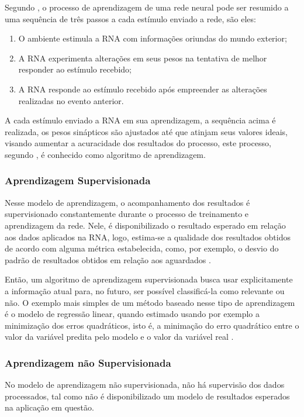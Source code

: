 Segundo , o processo de aprendizagem de uma rede neural pode ser resumido a uma sequência de três passos a cada estímulo enviado a rede, são eles:

\begin{enumerate}
	\item O ambiente estimula a RNA com informações oriundas do mundo exterior;
	\item A RNA experimenta alterações em seus pesos na tentativa de melhor responder ao estímulo recebido;
	\item A RNA responde ao estímulo recebido após empreender as alterações realizadas no evento anterior.
\end{enumerate}

A cada estímulo enviado a RNA em sua aprendizagem, a sequência acima é realizada, os pesos sinápticos são ajustados até que atinjam seus valores ideais, visando aumentar a acuracidade dos resultados do processo, este processo, segundo , é conhecido como algoritmo de aprendizagem.

\subsubsection{Aprendizagem Supervisionada}
Nesse modelo de aprendizagem, o acompanhamento dos resultados é supervisionado constantemente durante o processo de treinamento e aprendizagem da rede. Nele, é disponibilizado o resultado esperado em relação aos dados aplicados na RNA, logo, estima-se a qualidade dos resultados obtidos de acordo com alguma métrica estabelecida, como, por exemplo, o desvio do padrão de resultados obtidos em relação aos aguardados \cite{haykin2009}.

Então, um algoritmo de aprendizagem supervisionada busca usar explicitamente a informação atual para, no futuro,  ser possível classificá-la como relevante ou não. O exemplo mais simples de um método baseado nesse tipo de aprendizagem é o modelo de regressão linear, quando estimado usando por exemplo a minimização dos erros quadráticos, isto é, a minimação do erro quadrático entre o valor da variável predita pelo modelo e o valor da variável real \cite{elpink}.

\subsubsection{Aprendizagem não Supervisionada}
No modelo de aprendizagem não supervisionada, não há supervisão dos dados processados, tal como não é disponibilizado um modelo de resultados esperados na aplicação em questão.

